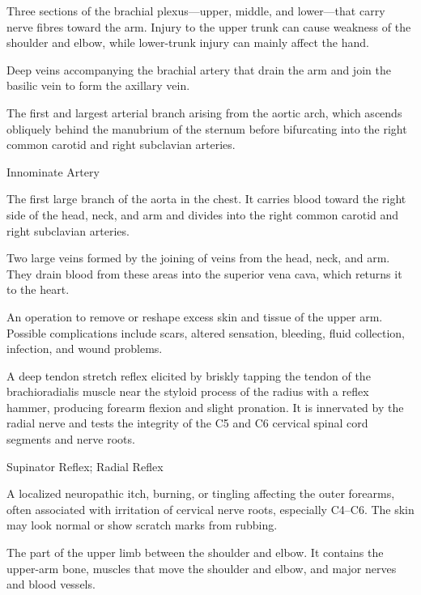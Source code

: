  Three sections of the brachial plexus—upper, middle, and lower—that carry nerve fibres toward the arm. Injury to the upper trunk can cause weakness of the shoulder and elbow, while lower-trunk injury can mainly affect the hand.

 Deep veins accompanying the brachial artery that drain the arm and join the basilic vein to form the axillary vein.

 The first and largest arterial branch arising from the aortic arch, which ascends obliquely behind the manubrium of the sternum before bifurcating into the right common carotid and right subclavian arteries.

\synonyms
Innominate Artery

 The first large branch of the aorta in the chest. It carries blood toward the right side of the head, neck, and arm and divides into the right common carotid and right subclavian arteries.

 Two large veins formed by the joining of veins from the head, neck, and arm. They drain blood from these areas into the superior vena cava, which returns it to the heart.

 An operation to remove or reshape excess skin and tissue of the upper arm. Possible complications include scars, altered sensation, bleeding, fluid collection, infection, and wound problems.

 A deep tendon stretch reflex elicited by briskly tapping the tendon of the brachioradialis muscle near the styloid process of the radius with a reflex hammer, producing forearm flexion and slight pronation. It is innervated by the radial nerve and tests the integrity of the C5 and C6 cervical spinal cord segments and nerve roots.

\synonyms
Supinator Reflex; Radial Reflex

 A localized neuropathic itch, burning, or
tingling affecting the outer forearms, often associated with irritation of
cervical nerve roots, especially C4--C6. The skin may look normal or show
scratch marks from rubbing.

 The part of the upper limb between the shoulder and elbow. It contains the upper-arm bone, muscles that move the shoulder and elbow, and major nerves and blood vessels.

